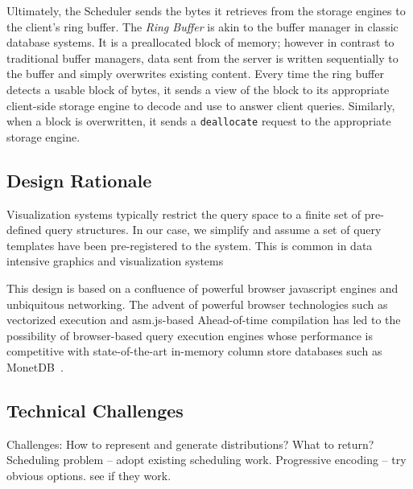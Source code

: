 Ultimately, the Scheduler sends the bytes it retrieves from the storage engines to the client's ring buffer.  The {\it Ring Buffer} is akin to the buffer manager in classic database systems.  It is a preallocated block of memory; however in contrast to traditional buffer managers, data sent from the server is written sequentially to the buffer and simply overwrites existing content.  Every time the ring buffer detects a usable block of bytes, it sends a view of the block to its appropriate client-side storage engine to decode and use to answer client queries.  Similarly, when a block is overwritten, it sends a \texttt{deallocate} request to the appropriate storage engine.

\subsection{Design Rationale}

Visualization systems typically restrict the query space to a finite set of pre-defined query structures.    In our case, we simplify and assume a set of query templates have been pre-registered to the system.  This is common in data intensive graphics and visualization systems~\cite{wireviz}


This design is based on a confluence of powerful browser javascript engines and unbiquitous networking.  The advent of powerful browser technologies such as vectorized execution and asm.js-based Ahead-of-time compilation has led to the possibility of browser-based query execution engines whose performance is competitive with state-of-the-art in-memory column store databases such as MonetDB~\cite{gebaly2016afterburner}.



\subsection{Technical Challenges}

Challenges:   How to represent and generate distributions?
What to return?  Scheduling problem -- adopt existing scheduling work.
Progressive encoding -- try obvious options.  see if they work.


